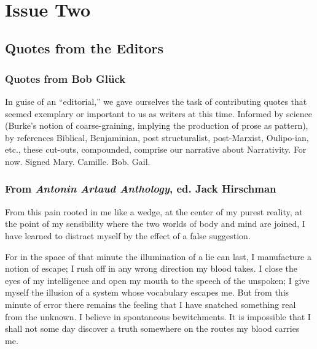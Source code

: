 \documentclass[
]{memoir}
\begin{document}
~

\part*{Issue Two}

\hypertarget{quotes-from-the-editors}{%
\chapter{Quotes from the Editors}\label{quotes-from-the-editors}}

\hypertarget{quotes-from-bob-gluxfcck}{%
\section*{Quotes from Bob Glück}\label{quotes-from-bob-gluxfcck}}

In guise of an ``editorial,'' we gave ourselves the task of contributing
quotes that seemed exemplary or important to us as writers at this time.
Informed by science (Burke's notion of coarse-graining, implying the
production of prose as pattern), by references Biblical, Benjaminian,
post structuralist, post-Marxist, Oulipo-ian, etc., these cut-outs,
compounded, comprise our narrative about Narrativity. For now. Signed
Mary. Camille. Bob. Gail. ~

\hypertarget{from-antonin-artaud-anthology-ed.-jack-hirschman}{%
\section*{\texorpdfstring{From \emph{Antonin Artaud Anthology}, ed. Jack
Hirschman}{From Antonin Artaud Anthology, ed. Jack Hirschman}}\label{from-antonin-artaud-anthology-ed.-jack-hirschman}}

From this pain rooted in me like a wedge, at the center of my purest
reality, at the point of my sensibility where the two worlds of body and
mind are joined, I have learned to distract myself by the effect of a
false suggestion.

For in the space of that minute the illumination of a lie can last, I
manufacture a notion of escape; I rush off in any wrong direction my
blood takes. I close the eyes of my intelligence and open my mouth to
the speech of the unspoken; I give myself the illusion of a system whose
vocabulary escapes me. But from this minute of error there remains the
feeling that I have snatched something real from the unknown. I believe
in spontaneous bewitchments. It is impossible that I shall not some day
discover a truth somewhere on the routes my blood carries me.
\end{document}
